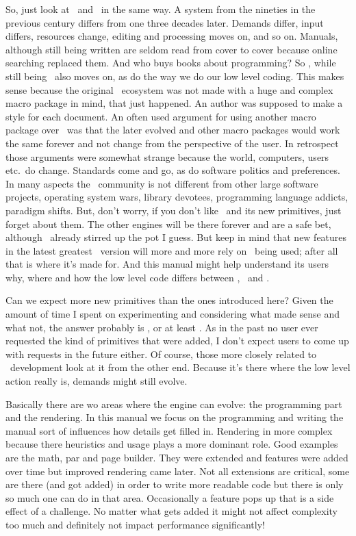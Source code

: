 So, just look at \TEX\ and \CONTEXT\ in the same way. A system from the nineties
in the previous century differs from one three decades later. Demands differ,
input differs, resources change, editing and processing moves on, and so on.
Manuals, although still being written are seldom read from cover to cover because
online searching replaced them. And who buys books about programming? So
\LUAMETATEX, while still being \TEX\ also moves on, as do the way we do our low
level coding. This makes sense because the original \TEX\ ecosystem was not made
with a huge and complex macro package in mind, that just happened. An author was
supposed to make a style for each document. An often used argument for using
another macro package over \CONTEXT\ was that the later evolved and other macro
packages would work the same forever and not change from the perspective of the
user. In retrospect those arguments were somewhat strange because the world,
computers, users etc.\ do change. Standards come and go, as do software politics
and preferences. In many aspects the \TEX\ community is not different from other
large software projects, operating system wars, library devotees, programming
language addicts, paradigm shifts. But, don't worry, if you don't like
\LUAMETATEX\ and its new primitives, just forget about them. The other engines
will be there forever and are a safe bet, although \LUATEX\ already stirred up
the pot I guess. But keep in mind that new features in the latest greatest
\CONTEXT\ version will more and more rely on \LUAMETATEX\ being used; after all
that is where it's made for. And this manual might help understand its users why,
where and how the low level code differs between \MKII, \MKIV\ and \LMTX.

Can we expect more new primitives than the ones introduced here? Given the amount
of time I spent on experimenting and considering what made sense and what not,
the answer probably is , or at least .
As in the past no user ever requested the kind of primitives that were added, I
don't expect users to come up with requests in the future either. Of course,
those more closely related to \CONTEXT\ development look at it from the other
end. Because it's there where the low level action really is, demands might still
evolve.

Basically there are wo areas where the engine can evolve: the programming part
and the rendering. In this manual we focus on the programming and writing the
manual sort of influences how details get filled in. Rendering in more complex
because there heuristics and usage plays a more dominant role. Good examples are
the math, par and page builder. They were extended and features were added over
time but improved rendering came later. Not all extensions are critical, some are
there (and got added) in order to write more readable code but there is only so
much one can do in that area. Occasionally a feature pops up that is a side
effect of a challenge. No matter what gets added it might not affect complexity
too much and definitely not impact performance significantly!

